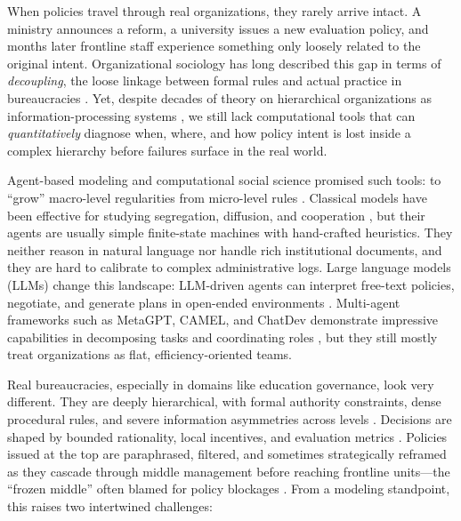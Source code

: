 \documentclass{article}
\begin{document}
When policies travel through real organizations, they rarely arrive intact. 
A ministry announces a reform, a university issues a new evaluation policy, and months later frontline staff experience something only loosely related to the original intent. 
Organizational sociology has long described this gap in terms of \emph{decoupling}, the loose linkage between formal rules and actual practice in bureaucracies \citep{meyer1977institutionalized,weick1976educational,clark1983higher}. 
Yet, despite decades of theory on hierarchical organizations as information-processing systems \citep{simon1997administrative,weber1978economy}, we still lack computational tools that can \emph{quantitatively} diagnose when, where, and how policy intent is lost inside a complex hierarchy before failures surface in the real world.

Agent-based modeling and computational social science promised such tools: to ``grow'' macro-level regularities from micro-level rules \citep{epstein2006generative,epstein1999generative,lazer2009computational,conte2012manifesto}. Classical models have been effective for studying segregation, diffusion, and cooperation \citep{schelling1971dynamic,nowak2006evolutionary,castellano2009statistical}, but their agents are usually simple finite-state machines with hand-crafted heuristics. They neither reason in natural language nor handle rich institutional documents, and they are hard to calibrate to complex administrative logs. Large language models (LLMs) change this landscape: LLM-driven agents can interpret free-text policies, negotiate, and generate plans in open-ended environments \citep{park2023generative,sumers2023cognitive,yao2022react}. Multi-agent frameworks such as MetaGPT, CAMEL, and ChatDev demonstrate impressive capabilities in decomposing tasks and coordinating roles \citep{hong2023metagpt,li2023camel,qian2024chatdev,gao2023llmabs,li2024llm_mas_survey,xi2025rise_agents}, but they still mostly treat organizations as flat, efficiency-oriented teams.


Real bureaucracies, especially in domains like education governance, look very different. 
They are deeply hierarchical, with formal authority constraints, dense procedural rules, and severe information asymmetries across levels \citep{weber1978economy,clark1983higher}. 
Decisions are shaped by bounded rationality, local incentives, and evaluation metrics \citep{simon1997administrative,goodhart1975problems,wu2019evaluation}. 
Policies issued at the top are paraphrased, filtered, and sometimes strategically reframed as they cascade through middle management before reaching frontline units---the ``frozen middle'' often blamed for policy blockages \citep{clark1983higher,shi2020governance,liu2022bigdata}. 
From a modeling standpoint, this raises two intertwined challenges:
\end{document}
